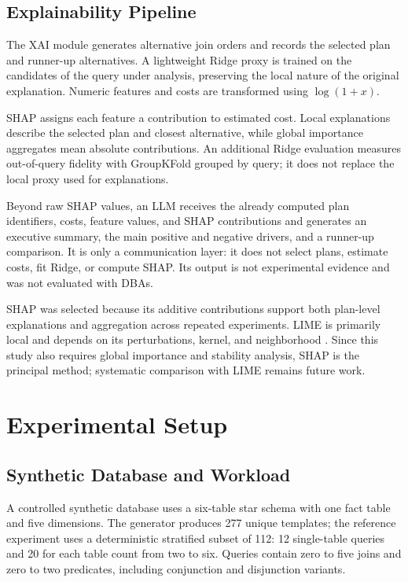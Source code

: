 \documentclass[conference]{IEEEtran}
\begin{document}
\subsection{Explainability Pipeline}

The XAI module generates alternative join orders and records the selected plan and runner-up alternatives. A lightweight Ridge proxy is trained on the candidates of the query under analysis, preserving the local nature of the original explanation. Numeric features and costs are transformed using $\log(1+x)$.

SHAP assigns each feature a contribution to estimated cost. Local explanations describe the selected plan and closest alternative, while global importance aggregates mean absolute contributions. An additional Ridge evaluation measures out-of-query fidelity with GroupKFold grouped by query; it does not replace the local proxy used for explanations.

Beyond raw SHAP values, an LLM receives the already computed plan identifiers, costs, feature values, and SHAP contributions and generates an executive summary, the main positive and negative drivers, and a runner-up comparison. It is only a communication layer: it does not select plans, estimate costs, fit Ridge, or compute SHAP. Its output is not experimental evidence and was not evaluated with DBAs.

SHAP was selected because its additive contributions support both plan-level explanations and aggregation across repeated experiments. LIME is primarily local and depends on its perturbations, kernel, and neighborhood \cite{b12}. Since this study also requires global importance and stability analysis, SHAP is the principal method; systematic comparison with LIME remains future work.

\section{Experimental Setup}

\subsection{Synthetic Database and Workload}

A controlled synthetic database uses a six-table star schema with one fact table and five dimensions. The generator produces 277 unique templates; the reference experiment uses a deterministic stratified subset of 112: 12 single-table queries and 20 for each table count from two to six. Queries contain zero to five joins and zero to two predicates, including conjunction and disjunction variants.
\end{document}
